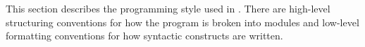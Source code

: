 This section describes the programming style used in {\mlton}.  There are
high-level structuring conventions for how the program is broken into modules
and low-level formatting conventions for how syntactic constructs are written.
